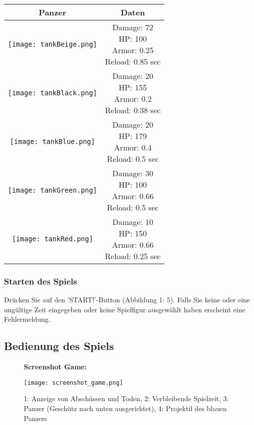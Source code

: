 \documentclass[a4paper]{scrartcl}
\begin{document}
\begin{tabular}{|c|c|}
\hline 
\textbf{Panzer} & \textbf{Daten} \\ 
\hline 
\texttt{[image: tankBeige.png]} & 
\parbox[c]{5cm}{Damage: 72 \\ HP: 100 \\ Armor: 0.25 \\ Reload: 0.85 sec\\}
\\ 
\hline 
\texttt{[image: tankBlack.png]} & \parbox[c]{5cm}{Damage: 20 \\HP: 155 \\  Armor: 0.2 \\ Reload: 0.38 sec\\} \\ 
\hline 
\texttt{[image: tankBlue.png]} & \parbox[c]{5cm}{Damage: 20\\HP: 179 \\  Armor: 0.4\\ Reload: 0.5 sec\\} \\ 
\hline 
\texttt{[image: tankGreen.png]} & \parbox[c]{5cm}{Damage: 30\\HP: 100\\  Armor: 0.66\\ Reload: 0.5 sec\\} \\ 
\hline 
\texttt{[image: tankRed.png]} & \parbox[c]{5cm}{Damage: 10\\HP: 150\\  Armor: 0.66\\ Reload: 0.25 sec\\} \\ 
\hline 
\end{tabular} 

\subsubsection{Starten des Spiels}
Drücken Sie auf den 'START!'-Button (Abbildung 1: 5). Falls Sie keine oder eine ungültige Zeit eingegeben oder keine Spielfigur ausgewählt haben erscheint eine Fehlermeldung.

\newpage
\subsection{Bedienung des Spiels}
\begin{figure}[H]
  \textbf{Screenshot Game:}\par\medskip
  \centering
\texttt{[image: screenshot\_game.png]}    \caption{1: Anzeige von Abschüssen und Toden, 2: Verbleibende Spielzeit, 3: Panzer (Geschütz nach unten ausgerichtet), 4: Projektil des blauen Panzers}
\end{figure}
\end{document}
